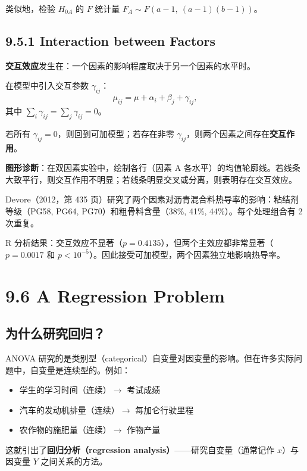 类似地，检验 $H_{0A}$ 的 $F$ 统计量 $F_A \sim F(a-1,\ (a-1)(b-1))$。

\subsection{9.5.1 Interaction between Factors}\label{sec:9.5.1}

\textbf{交互效应}发生在：一个因素的影响程度取决于另一个因素的水平时。

在模型中引入交互参数 $\gamma_{ij}$：
\[
\mu_{ij} = \mu + \alpha_i + \beta_j + \gamma_{ij},
\label{eq:two-way-interaction-model}
\]
其中 $\sum_i \gamma_{ij} = \sum_j \gamma_{ij} = 0$。

若所有 $\gamma_{ij} = 0$，则回到可加模型；若存在非零 $\gamma_{ij}$，则两个因素之间存在\textbf{交互作用}。

\textbf{图形诊断}：在双因素实验中，绘制各行（因素 A 各水平）的均值轮廓线。若线条大致平行，则交互作用不明显；若线条明显交叉或分离，则表明存在交互效应。

\begin{example}[沥青混合料热导率]\label{ex:asphalt-conductivity}
Devore（2012，第 435 页）研究了两个因素对沥青混合料热导率的影响：粘结剂等级（PG58, PG64, PG70）和粗骨料含量（38\%, 41\%, 44\%）。每个处理组合有 2 次重复。

R 分析结果：交互效应不显著（$p = 0.4135$），但两个主效应都非常显著（$p = 0.0017$ 和 $p < 10^{-5}$）。因此接受可加模型，两个因素独立地影响热导率。
\end{example}

\section{9.6 A Regression Problem}\label{sec:9.6}

\subsection{为什么研究回归？}

ANOVA 研究的是类别型（categorical）自变量对因变量的影响。但在许多实际问题中，自变量是连续型的。例如：
\begin{itemize}
\item 学生的学习时间（连续）$\to$ 考试成绩
\item 汽车的发动机排量（连续）$\to$ 每加仑行驶里程
\item 农作物的施肥量（连续）$\to$ 作物产量
\end{itemize}

这就引出了\textbf{回归分析（regression analysis）}——研究自变量（通常记作 $x$）与因变量 $Y$ 之间关系的方法。

